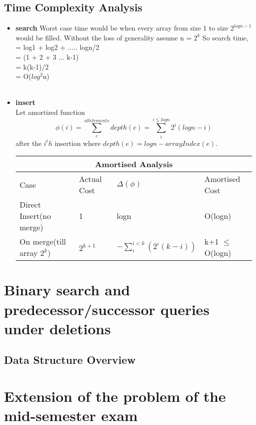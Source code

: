 \documentclass{article}
\begin{document}
\subsection{Time Complexity Analysis}
\begin{itemize}
  \item \textbf{search} Worst case time would be when every array from size 1 to size $2^{logn-1}$ would be filled. Without the loss of generality assume n = $2^k$
    So search time,\\
    = log1 + log2 + $.....$ logn/2 \\
    = (1 + 2 + 3 $...$ k-1) \\
    = k(k-1)/2 \\
    = O($log^2$n) \\
    \\
  \item \textbf{insert}\\
    Let amortized function $$\phi(i) = \sum_{e}^{all elements}depth(e)  = \sum_{i}^{i \leq logn} 2^i(logn - i) $$ after the $i^th$ insertion where $depth(e) = logn - arrayIndex(e)$.\\
    \begin{tabular}{|p{4cm}|p{3cm}|p{3cm}|p{3cm}|  }
      \hline
      \multicolumn{4}{|c|}{Amortised Analysis} \\
      \hline
      Case & Actual Cost& $\Delta(\phi)$ & Amortised Cost\\
      \hline
      Direct Insert(no merge) & 1           & logn & O(logn)   \\
      On merge(till array $2^k$) & $2^{k+1}$   & $-\sum_{i}^{i<k} (2^i(k-i))$ & k+1 $\leq$ O(logn) \\
      \hline
    \end{tabular}

\end{itemize}

\newpage
\section{Binary search and predecessor/successor queries under deletions}
\subsection{Data Structure Overview}

\newpage    
\section{Extension of the problem of the mid-semester exam}
\end{document}
